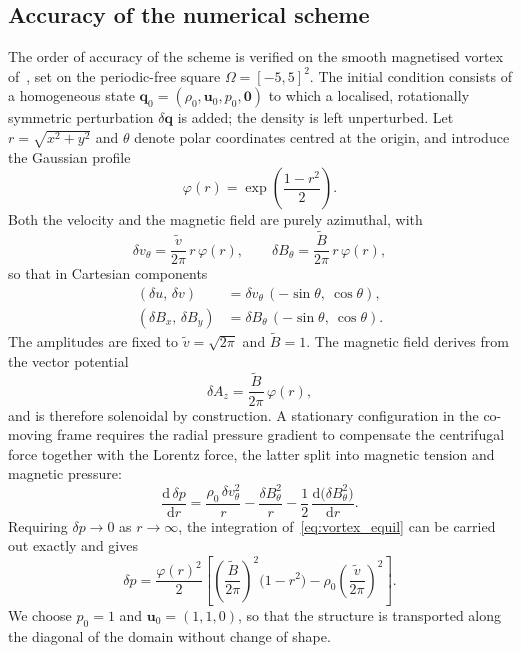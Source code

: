 \documentclass[a4paper,fleqn]{cas-sc}
\theoremstyle{remark}
\begin{document}
\subsection{Accuracy of the numerical scheme}
\label{sec:accuracy}
The order of accuracy of the scheme is verified on the smooth magnetised
vortex of~\cite{accuracyvortex, BoscheriThomann2024}, set on the periodic-free
square $\Omega=[-5,5]^2$. The initial condition consists of a homogeneous state
$\mathbf{q}_0=(\rho_0,\mathbf{u}_0,p_0,\mathbf{0})$ to which a localised,
rotationally symmetric perturbation $\delta\mathbf{q}$ is added; the density is
left unperturbed. Let $r=\sqrt{x^2+y^2}$ and $\theta$ denote polar coordinates
centred at the origin, and introduce the Gaussian profile
%
\begin{equation}
\varphi(r)=\exp\!\left(\frac{1-r^{2}}{2}\right).
\label{eq:vortex_profile}
\end{equation}
%
Both the velocity and the magnetic field are purely azimuthal, with
%
\begin{equation}
\delta v_\theta=\frac{\tilde{v}}{2\pi}\,r\,\varphi(r),
\qquad
\delta B_\theta=\frac{\tilde{B}}{2\pi}\,r\,\varphi(r),
\label{eq:vortex_theta}
\end{equation}
%
so that in Cartesian components
%
\begin{align}
(\delta u,\,\delta v)&=\delta v_\theta\,(-\sin\theta,\ \cos\theta),
\label{eq:vortex_vel}\\[2pt]
(\delta B_x,\,\delta B_y)&=\delta B_\theta\,(-\sin\theta,\ \cos\theta).
\label{eq:vortex_mag}
\end{align}
%
The amplitudes are fixed to $\tilde{v}=\sqrt{2\pi}$ and $\tilde{B}=1$. The
magnetic field derives from the vector potential
%
\begin{equation}
\delta A_z=\frac{\tilde{B}}{2\pi}\,\varphi(r),
\label{eq:vortex_Az}
\end{equation}
%
and is therefore solenoidal by construction. A stationary configuration in the
co-moving frame requires the radial pressure gradient to compensate the
centrifugal force together with the Lorentz force, the latter split into
magnetic tension and magnetic pressure:
%
\begin{equation}
\frac{\mathrm{d}\,\delta p}{\mathrm{d}r}
 =\frac{\rho_0\,\delta v_\theta^{2}}{r}
 -\frac{\delta B_\theta^{2}}{r}
 -\frac{1}{2}\,\frac{\mathrm{d}\bigl(\delta B_\theta^{2}\bigr)}{\mathrm{d}r}.
\label{eq:vortex_equil}
\end{equation}
%
Requiring $\delta p\to 0$ as $r\to\infty$, the integration
of~\eqref{eq:vortex_equil} can be carried out exactly and gives
%
\begin{equation}
\delta p=\frac{\varphi(r)^{2}}{2}
 \left[\left(\frac{\tilde{B}}{2\pi}\right)^{\!2}\bigl(1-r^{2}\bigr)
 -\rho_0\left(\frac{\tilde{v}}{2\pi}\right)^{\!2}\right].
\label{eq:vortex_dp}
\end{equation}
%
We choose $p_0=1$ and $\mathbf{u}_0=(1,1,0)$, so that the structure is
transported along the diagonal of the domain without change of shape.
\end{document}
